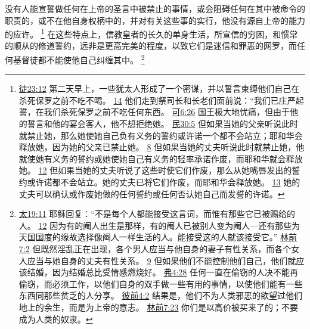 \documentclass[12pt, a4paper, oneside]{ctexart}
\newcounter{parnum}[section]
\newcommand{\N}{%
   \noindent\refstepcounter{parnum}%
    \makebox[\parindent][l]{\textbf{\arabic{parnum}.}}}
\begin{document}
\N 没有人能宣誓做任何在上帝的圣言中被禁止的事情，或会阻碍任何在其中被命令的职责的，或不在他自身权柄中的，并对有关这些事的实行，他没有源自上帝的能力的应许。
	\footnote {
		\href{https://biblehub.com/acts/23-12.htm}{徒23:12} 第二天早上，一些犹太人形成了一个密谋，并以誓言束缚他们自己在杀死保罗之前不吃不喝。
		\href{https://biblehub.com/acts/23-14.htm}{14} 他们走到祭司长和长老们面前说：“我们已庄严起誓，在我们杀死保罗之前不吃任何东西。
		\href{https://biblehub.com/mark/6-26.htm}{可6:26} 国王极大地忧痛，但由于他的誓言和他的宴会客人，他不想拒绝她。
		\href{https://biblehub.com/numbers/30-5.htm}{民30:5} 但如果当她的父亲听说此时就禁止她，那么她使她自己负有义务的誓约或许诺一个都不会站立；耶和华会释放她，因为她的父亲已禁止她。
		\href{https://biblehub.com/numbers/30-8.htm}{8} 但如果当她的丈夫听说此时就禁止她，他就使她有义务的誓约或她使她自己有义务的轻率承诺作废，而耶和华就会释放她。
		\href{https://biblehub.com/numbers/30-12.htm}{12} 但如果当她的丈夫听说了这些时使它们作废，那么从她嘴唇发出的誓约或许诺都不会站立。她的丈夫已将它们作废，而耶和华会释放她。
		\href{https://biblehub.com/numbers/30-13.htm}{13} 她的丈夫可以确认或作废她做的任何誓约或任何否认她自己而发誓的许诺。
	}
	在这些特点上，信教皇者的长久的单身生活，所宣信的穷困，和惯常的顺从的修道誓约，远非是更高完美的程度，以致它们是迷信和罪恶的网罗，而任何基督徒都不能使他自己纠缠其中。
	\footnote {
		\href{https://biblehub.com/matthew/19-11.htm}{太19:11} 耶稣回复：“不是每个人都能接受这言词，而惟有那些它已被赐给的人。
		\href{https://biblehub.com/matthew/19-12.htm}{12} 因为有的阉人出生是那样，有的阉人已被别人变为阉人---还有那些为天国国度的缘故选择像阉人一样生活的人。能接受这的人就该接受它。”
		\href{https://biblehub.com/1_corinthians/7-2.htm}{林前7:2} 但既然淫乱正在出现，各个男人应当与他自身的妻子有性关系，而各个女人应当与她自身的丈夫有性关系。
		\href{https://biblehub.com/1_corinthians/7-9.htm}{9} 但如果他们不能控制他们自己，他们就应该结婚，因为结婚总比受情感燃烧好。
		\href{https://biblehub.com/ephesians/4-28.htm}{弗4:28} 任何一直在偷窃的人决不能再偷窃，而必须工作，以他们自身的双手做一些有用的事情，以使他们能有一些东西同那些贫乏的人分享。
		\href{https://biblehub.com/1_peter/4-2.htm}{彼前4:2} 结果是，他们不为人类邪恶的欲望过他们地上的余生，而是为上帝的意志。
		\href{https://biblehub.com/1_corinthians/7-23.htm}{林前7:23} 你们是以高价被买来了的；不要成为人类的奴隶。
	}
\end{document}
